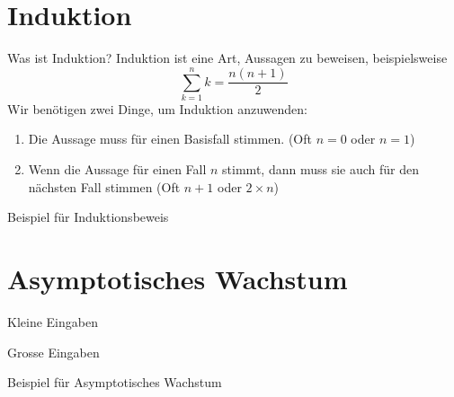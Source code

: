 \documentclass[aspectratio=169]{beamer}
\begin{document}
  \section{Induktion}
  \begin{frame}{Was ist Induktion?}
    Induktion ist eine Art, Aussagen zu beweisen, beispielsweise \[\sum_{k=1}^n k = \frac{n(n+1)}{2}\] Wir benötigen zwei Dinge, um Induktion anzuwenden:
    \begin{enumerate}
      \item Die Aussage muss für einen Basisfall stimmen. (Oft \(n=0\) oder \(n=1\))
      \item Wenn die Aussage für einen Fall \(n\) stimmt, dann muss sie auch für den nächsten Fall stimmen (Oft \(n+1\) oder \(2\times n\))
    \end{enumerate}
  \end{frame}
  \begin{frame}[standout]
    Beispiel für Induktionsbeweis
  \end{frame}
  \section{Asymptotisches Wachstum}
  \begin{frame}{Kleine Eingaben}
    \begin{center}
    \end{center}
  \end{frame}
  \begin{frame}{Grosse Eingaben}
    \begin{center}
    \end{center}
  \end{frame}
  \begin{frame}[standout]
    Beispiel für Asymptotisches Wachstum
  \end{frame}
\end{document}
